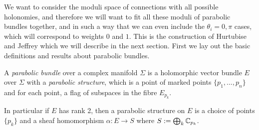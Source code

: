 	We want to consider the moduli space of connections with all possible holonomies, and therefore we will want to fit all these moduli of parabolic bundles together, and in such a way that we can even include the $\theta_i = 0,\pi$ cases, which will correspond to weights $0$ and $1$. This is the construction of Hurtubise and Jeffrey which we will describe in the next section. First we lay out the basic definitions and results about parabolic bundles.
	\begin{definition}
		A \emph{parabolic bundle} over a complex manifold $\Sigma$ is a holomorphic vector bundle $E$ over $\Sigma$ with a \emph{parabolic structure}, which is a point of marked points $\{p_1,...,p_n\}$ and for each point, a flag of subspaces in the fibre $E_{p_k}$. 
	\end{definition}
	In particular if $E$ has rank 2, then a parabolic structure on $E$ is a choice of points $\{p_k\}$ and a sheaf homomorphism $\alpha:E\to S$ where $S := \bigoplus_{k} \mathbb{C}_{p_k}$.
	
